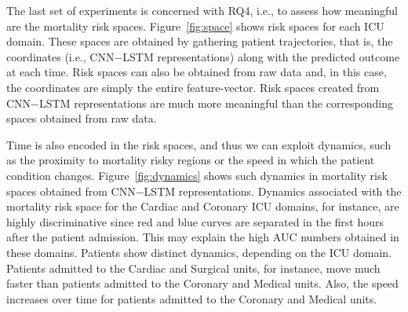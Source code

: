 The last set of experiments is concerned with RQ4, i.e., to assess how meaningful are the mortality risk spaces. Figure~\ref{fig:space} shows risk spaces for each ICU domain. These spaces are obtained by gathering patient trajectories, that is, the coordinates (i.e., CNN$-$LSTM representations) along with the predicted outcome at each time. Risk spaces can also be obtained from raw data and, in this case, the coordinates are simply the entire feature-vector. Risk spaces created from CNN$-$LSTM representations are much more meaningful than the corresponding spaces obtained from raw data.

Time is also encoded in the risk spaces, and thus we can exploit dynamics, such as the proximity to mortality risky regions or the speed in which the patient condition changes. Figure~\ref{fig:dynamics} shows such dynamics in mortality risk spaces obtained from CNN$-$LSTM representations. Dynamics associated with the mortality risk space for the Cardiac and Coronary ICU domains, for instance, are highly discriminative since red and blue curves are separated in the first hours after the patient admission. This may explain the high AUC numbers obtained in these domains. Patients show distinct dynamics, depending on the ICU domain. Patients admitted to the Cardiac and Surgical units, for instance, move much faster than patients admitted to the Coronary and Medical units. Also, the speed increases over time for patients admitted to the Coronary and Medical units.